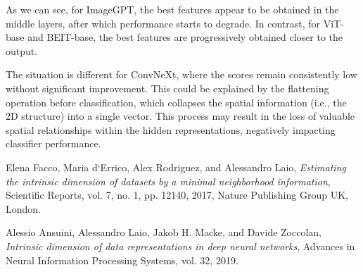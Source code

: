 \documentclass[
  11pt,
  a4paper,
  onecolumn]{article}
\begin{document}
As we can see, for ImageGPT, the best features appear to be obtained in the middle layers, after which performance starts to degrade. In contrast, for ViT-base and BEIT-base, the best features are progressively obtained closer to the output. 

The situation is different for ConvNeXt, where the scores remain consistently low without significant improvement. This could be explained by the flattening operation before classification, which collapses the spatial information (i.e., the 2D structure) into a single vector. This process may result in the loss of valuable spatial relationships within the hidden representations, negatively impacting classifier performance.

\vspace{50pt}
\begin{thebibliography}{9}

Elena Facco, Maria d`Errico, Alex Rodriguez, and Alessandro Laio,
\textit{Estimating the intrinsic dimension of datasets by a minimal neighborhood information},
Scientific Reports, vol. 7, no. 1, pp. 12140, 2017, Nature Publishing Group UK, London.

  Alessio Ansuini, Alessandro Laio, Jakob H. Macke, and Davide Zoccolan,
  \textit{Intrinsic dimension of data representations in deep neural networks},
  Advances in Neural Information Processing Systems, vol. 32, 2019.

\end{thebibliography}
\end{document}

